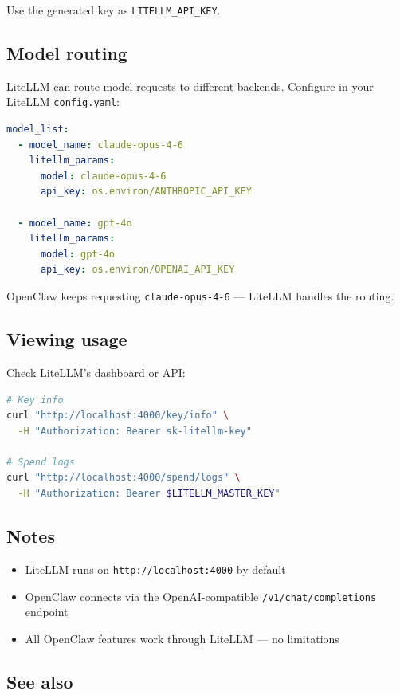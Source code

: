 Use the generated key as \texttt{LITELLM\_API\_KEY}.

\subsection{Model routing}


LiteLLM can route model requests to different backends. Configure in your LiteLLM \texttt{config.yaml}:

\begin{lstlisting}[language=yaml]
model_list:
  - model_name: claude-opus-4-6
    litellm_params:
      model: claude-opus-4-6
      api_key: os.environ/ANTHROPIC_API_KEY

  - model_name: gpt-4o
    litellm_params:
      model: gpt-4o
      api_key: os.environ/OPENAI_API_KEY
\end{lstlisting}


OpenClaw keeps requesting \texttt{claude-opus-4-6} — LiteLLM handles the routing.

\subsection{Viewing usage}


Check LiteLLM's dashboard or API:

\begin{lstlisting}[language=bash]
# Key info
curl "http://localhost:4000/key/info" \
  -H "Authorization: Bearer sk-litellm-key"

# Spend logs
curl "http://localhost:4000/spend/logs" \
  -H "Authorization: Bearer $LITELLM_MASTER_KEY"
\end{lstlisting}


\subsection{Notes}


\begin{itemize}
  \item LiteLLM runs on \texttt{http://localhost:4000} by default
  \item OpenClaw connects via the OpenAI-compatible \texttt{/v1/chat/completions} endpoint
  \item All OpenClaw features work through LiteLLM — no limitations
\end{itemize}


\subsection{See also}


